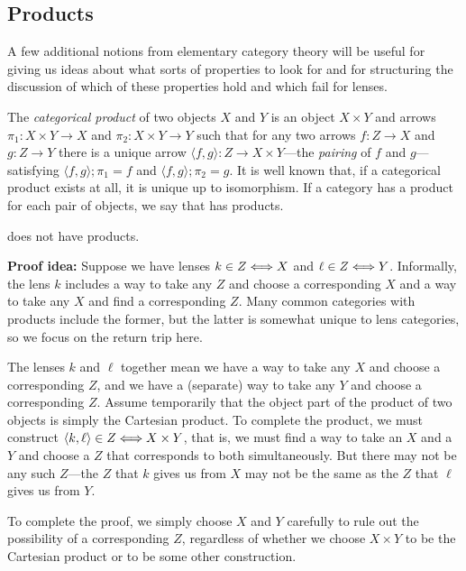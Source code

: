 \begin{defn}[$R$-similarity]
\begin{theorem}
\begin{lemma}
\section{Products}\label{prod}

A few additional notions from elementary category theory will be useful for
giving 
us ideas about what sorts of properties to look for and for 
structuring the discussion of which of these properties hold and which fail
for lenses.

The \emph{categorical product} of two objects $X$ and $Y$ is an object
$X\times Y$ and arrows $\pi_1:X\times Y\rightarrow X$
and $\pi_2:X\times Y\rightarrow Y$ such that for any two arrows $f :
Z\rightarrow X$ and $g:Z\rightarrow Y$ there is a unique arrow
$\langle f,g\rangle:Z\rightarrow X\times Y$---the {\em pairing} of $f$ and
$g$---satisfying $\langle f,g\rangle;\pi_1=f$ and $\langle
f,g\rangle;\pi_2=g$. It is well known that, if a categorical product
exists at all, it is unique up to isomorphism.
%
If a category \catC has a product for each pair of objects, we say that
\catC has products.

\iffull
\begin{theorem}[No products]\label{noprod}
\else
\begin{theorem}\label{noprod}
\fi
  \LENS{} does not have products.
\end{theorem}
{\bf Proof idea:} Suppose we have lenses $k \in Z \Longleftrightarrow X$ and $\ell \in Z
\Longleftrightarrow Y$. Informally, the lens $k$ includes a way to take any $Z$ and choose
a corresponding $X$ and a way to take any $X$ and find a corresponding $Z$.
Many common categories with products include the former, but the latter is
somewhat unique to lens categories, so we focus on the return trip here.

The lenses $k$ and $\ell$ together mean we have a way to take any $X$ and
choose a
corresponding $Z$, and we have a (separate) way to take any $Y$ and choose a
corresponding $Z$. Assume temporarily that the object part of the product of
two objects is simply the Cartesian product. To complete the product, we
must construct $\left<k,\ell\right> \in Z \Longleftrightarrow X \times Y$, that is, we
must find a way to take an $X$ and a $Y$ and choose a $Z$ that
corresponds to both simultaneously. But there may not be any such $Z$---the
$Z$ that $k$ gives us from $X$ may not be the same as the $Z$ that $\ell$
gives us from $Y$.

To complete the proof, we simply choose $X$ and $Y$ carefully to rule out
the possibility of a corresponding $Z$, regardless of whether we choose $X
\times Y$ to be the Cartesian product or to be some other construction.


\end{theorem}
\end{lemma}
\end{theorem}
\end{defn}
